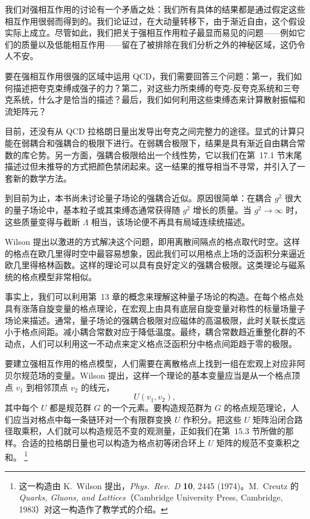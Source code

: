 我们对强相互作用的讨论有一个矛盾之处：我们所有具体的结果都是通过假定这些相互作用很弱而得到的。我们论证过，在大动量转移下，由于渐近自由，这个假设实际上成立。尽管如此，我们把关于强相互作用粒子最显而易见的问题——例如它们的质量以及低能相互作用——留在了被排除在我们分析之外的神秘区域，这仍令人不安。

要在强相互作用很强的区域中运用 QCD，我们需要回答三个问题：第一，我们如何描述把夸克束缚成强子的力？第二，对这些力所束缚的夸克-反夸克系统和三夸克系统，什么才是恰当的描述？最后，我们如何利用这些束缚态来计算散射振幅和流矩阵元？

目前，还没有从 QCD 拉格朗日量出发导出夸克之间完整力的途径。显式的计算只能在弱耦合和强耦合的极限下进行。在弱耦合极限下，结果是具有渐近自由耦合常数的库仑势。另一方面，强耦合极限给出一个线性势，它以我们在第~17.1 节末尾描述过但未推导的方式把颜色禁闭起来。这一结果的推导相当不寻常，并引入了一套新的数学方法。

到目前为止，本书尚未讨论量子场论的强耦合近似。原因很简单：在耦合 $g^2$ 很大的量子场论中，基本粒子或其束缚态通常获得随 $g^2$ 增长的质量。当 $g^2\to\infty$ 时，这些质量变得与截断 $\Lambda$ 相当，该场论便不再具有局域连续统描述。

Wilson 提出以激进的方式解决这个问题，即用离散间隔点的格点取代时空。这样的格点在欧几里得时空中最容易想象，因此我们可以用格点上场的泛函积分来逼近欧几里得格林函数。这样的理论可以具有良好定义的强耦合极限。这类理论与磁系统的格点模型非常相似。

事实上，我们可以利用第~13 章的概念来理解这种量子场论的构造。在每个格点处具有涨落自旋变量的格点理论，在宏观上由具有底层自旋变量对称性的标量场量子场论来描述。通常，量子场论的强耦合极限对应磁体的高温极限，此时关联长度远小于格点间距。减小耦合常数对应于降低温度。最终，耦合常数趋近重整化群的不动点，人们可以利用这一不动点来定义格点泛函积分中格点间距趋于零的极限。

要建立强相互作用的格点模型，人们需要在离散格点上找到一组在宏观上对应非阿贝尔规范场的变量。Wilson 提出，这样一个理论的基本变量应当是从一个格点顶点 $v_1$ 到相邻顶点 $v_2$ 的线元，
\begin{equation}
  U(v_1, v_2) ,
  \label{eq:22.1}
\end{equation}
其中每个 $U$ 都是规范群 $G$ 的一个元素。要构造规范群为 $G$ 的格点规范理论，人们应当对格点中每一条链环对一个有限群变换 $U$ 作积分。把这些 $U$ 矩阵沿闭合路径取乘积，人们就可以构造规范不变的观测量，正如我们在第~15.3 节所做的那样。合适的拉格朗日量也可以构造为格点初等闭合环上 $U$ 矩阵的规范不变乘积之和。%
\footnote{这一构造由 K.~Wilson 提出，\emph{Phys.\ Rev.\ D} \textbf{10}, 2445 (1974)。M.~Creutz 的 \emph{Quarks, Gluons, and Lattices}（Cambridge University Press, Cambridge, 1983）对这一构造作了教学式的介绍。}

